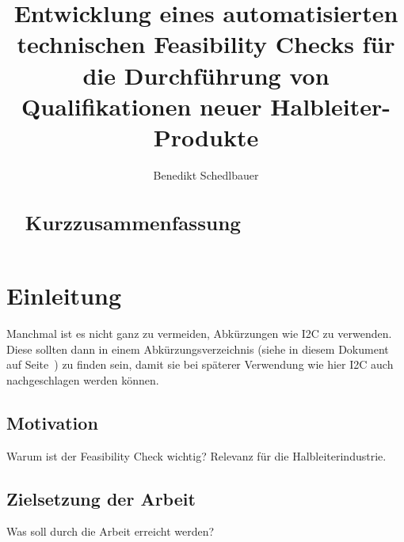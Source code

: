 \documentclass[fontsize=12pt,
parskip=half,	%
department=FakM,  %
twoside, %
DIV=15,BCOR=10mm, %
]{OTHRreprt}
\title{Entwicklung eines automatisierten technischen Feasibility Checks für die Durchführung von Qualifikationen neuer Halbleiter-Produkte}
\author{Benedikt Schedlbauer}
\begin{document}
	\maketitle
	\cleardoublepage
	\begin{abstract}
	\section*{Kurzzusammenfassung}
	\begin{quote}
	\lipsum[1]
	\end{quote}
	\end{abstract}
	\cleardoublepage
	\tableofcontents
	\cleardoublepage		
		
	
	\chapter{Einleitung}

	Manchmal ist es nicht ganz zu vermeiden, Abkürzungen wie \ac{I2C} zu verwenden. 
	Diese sollten dann in einem Abkürzungsverzeichnis (siehe in diesem Dokument auf Seite~\pageref{Sec:Abkuerzungen}) zu finden sein, damit sie bei späterer Verwendung wie hier \ac{I2C} auch nachgeschlagen werden können.

	\section{Motivation}
	Warum ist der Feasibility Check wichtig? Relevanz für die Halbleiterindustrie.
	\section{Zielsetzung der Arbeit}
	Was soll durch die Arbeit erreicht werden?
\end{document}
